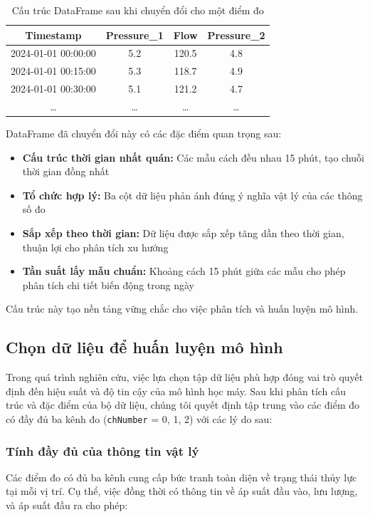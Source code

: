 \begin{table}[htbp]
    \centering
    \begin{tabular}{|c|c|c|c|}
        \hline
        \textbf{Timestamp} & \textbf{Pressure\_1} & \textbf{Flow} & \textbf{Pressure\_2} \\
        \hline
        2024-01-01 00:00:00 & 5.2 & 120.5 & 4.8 \\
        2024-01-01 00:15:00 & 5.3 & 118.7 & 4.9 \\
        2024-01-01 00:30:00 & 5.1 & 121.2 & 4.7 \\
        \ldots & \ldots & \ldots & \ldots \\
        \hline
    \end{tabular}
    \caption{Cấu trúc DataFrame sau khi chuyển đổi cho một điểm đo}
    \label{tab:transformed_data_structure}
\end{table}

DataFrame đã chuyển đổi này có các đặc điểm quan trọng sau:

\begin{itemize}
    \item \textbf{Cấu trúc thời gian nhất quán:} Các mẫu cách đều nhau 15 phút, tạo chuỗi thời gian đồng nhất
    \item \textbf{Tổ chức hợp lý:} Ba cột dữ liệu phản ánh đúng ý nghĩa vật lý của các thông số đo
    \item \textbf{Sắp xếp theo thời gian:} Dữ liệu được sắp xếp tăng dần theo thời gian, thuận lợi cho phân tích xu hướng
    \item \textbf{Tần suất lấy mẫu chuẩn:} Khoảng cách 15 phút giữa các mẫu cho phép phân tích chi tiết biến động trong ngày
\end{itemize}

Cấu trúc này tạo nền tảng vững chắc cho việc phân tích và huấn luyện mô hình.

\subsection{Chọn dữ liệu để huấn luyện mô hình}
Trong quá trình nghiên cứu, việc lựa chọn tập dữ liệu phù hợp đóng vai trò quyết định đến hiệu suất và độ tin cậy của mô hình học máy. Sau khi phân tích cấu trúc và đặc điểm của bộ dữ liệu, chúng tôi quyết định tập trung vào các điểm đo có đầy đủ ba kênh đo (\texttt{chNumber} = 0, 1, 2) với các lý do sau:

\subsubsection{Tính đầy đủ của thông tin vật lý}
Các điểm đo có đủ ba kênh cung cấp bức tranh toàn diện về trạng thái thủy lực tại mỗi vị trí. Cụ thể, việc đồng thời có thông tin về áp suất đầu vào, lưu lượng, và áp suất đầu ra cho phép:

